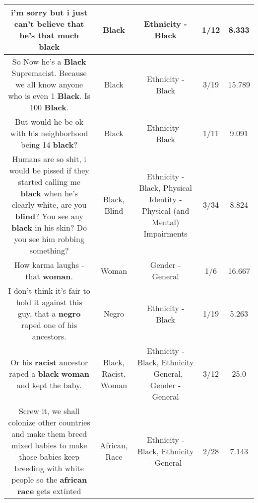 \documentclass[11pt]{article}
\newlength\mylength
\begin{document}
\begin{center}
\begin{longtable}{|C{.65\mylength}|C{.30\mylength}|C{.12\mylength}|C{.12\mylength}|C{.12\mylength}|}
  \small i'm sorry but i just can't believe that he's that much black\normalsize   & Black & Ethnicity - Black & 1/12 & 8.333 \\  \hline
  \small So Now he's a \textbf{Black} Supremacist. Because we all know anyone who is even 1 \textbf{Black}. Is 100 \textbf{Black}.\normalsize   & Black & Ethnicity - Black & 3/19 & 15.789 \\  \hline
  \small But would he be ok with his neighborhood being 14 \textbf{black}?\normalsize   & Black & Ethnicity - Black & 1/11 & 9.091 \\  \hline
  \small Humans are so shit, i would be pissed if they started calling me \textbf{black} when he's clearly white, are you \textbf{blind}? You see any \textbf{black} in his skin? Do you see him robbing something?\normalsize   & Black, Blind & Ethnicity - Black, Physical Identity - Physical (and Mental) Impairments & 3/34 & 8.824 \\  \hline
  \small How karma laughs - that \textbf{woman}.\normalsize   & Woman & Gender - General & 1/6 & 16.667 \\  \hline
  \small I don't think it's fair to hold it against this guy, that a \textbf{negro} raped one of his ancestors.\normalsize   & Negro & Ethnicity - Black & 1/19 & 5.263 \\  \hline
  \small Or his \textbf{racist} ancestor raped a \textbf{black} \textbf{woman} and kept the baby.\normalsize   & Black, Racist, Woman & Ethnicity - Black, Ethnicity - General, Gender - General & 3/12 & 25.0 \\  \hline
  \small Screw it, we shall colonize other countries and make them breed mixed babies to make those babies keep breeding with white people so the \textbf{african} \textbf{race} gets extinted\normalsize   & African, Race & Ethnicity - Black, Ethnicity - General & 2/28 & 7.143 \\  \hline

\end{longtable}
\end{center}
\end{document}
